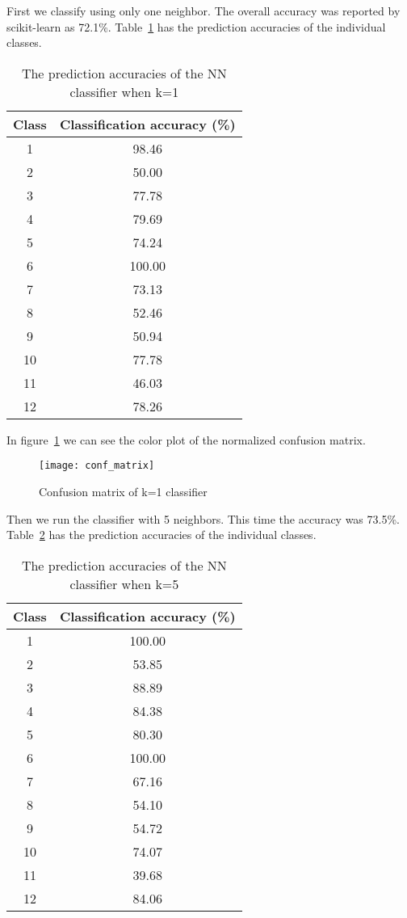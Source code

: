 First we classify using only one neighbor. The overall accuracy was reported by
scikit-learn as 72.1\%.
Table~\ref{tab:accuracy_k1} has the prediction accuracies of the individual
classes.
\begin{table}
  \centering
  \caption{The prediction accuracies of the NN classifier when k=1}
  \begin{tabular}{cc}  
    \toprule
    \cmidrule(r){1-2}
    Class    & Classification accuracy (\%) \\
    \midrule

    1	& 98.46  \\
    2	& 50.00  \\
    3	& 77.78  \\
    4	& 79.69  \\
    5	& 74.24  \\
    6	& 100.00  \\
    7	& 73.13  \\
    8	& 52.46  \\
    9	& 50.94  \\
    10	& 77.78  \\
    11	& 46.03  \\
    12	& 78.26  \\

    \bottomrule
  \end{tabular}
\label{tab:accuracy_k1}
\end{table}


In figure~\ref{fig:conf_mat} we can see the color plot
of the normalized confusion matrix.
\begin{figure}[h]
  \centering
  \texttt{[image: conf\_matrix]}
  \caption{Confusion matrix of k=1 classifier}
\label{fig:conf_mat}
\end{figure}


Then we run the classifier with 5 neighbors. This time the accuracy was 73.5\%.
Table~\ref{tab:accuracy_k5} has the prediction accuracies of the individual
classes.
\begin{table}
  \centering
  \caption{The prediction accuracies of the NN classifier when k=5}
  \begin{tabular}{cc}  
    \toprule
    \cmidrule(r){1-2}
    Class    & Classification accuracy (\%) \\
    \midrule

    1	& 100.00  \\
    2	& 53.85  \\
    3	& 88.89  \\
    4	& 84.38  \\
    5	& 80.30  \\
    6	& 100.00  \\
    7	& 67.16  \\
    8	& 54.10  \\
    9	& 54.72  \\
    10	& 74.07  \\
    11	& 39.68  \\
    12	& 84.06  \\

    \bottomrule
  \end{tabular}
\label{tab:accuracy_k5}
\end{table}

